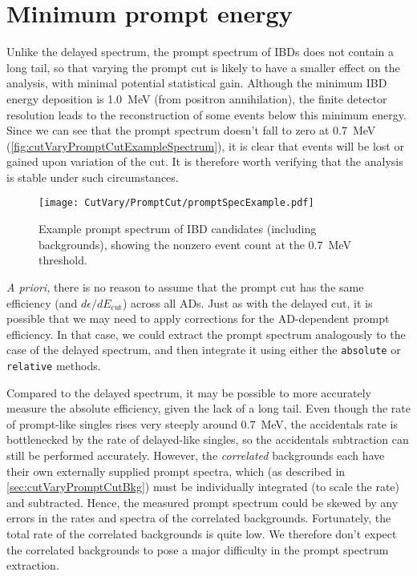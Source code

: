 \documentclass[../thesis.tex]{subfiles}
\begin{document}
\section{Minimum prompt energy}
\label{sec:cutVaryMinPrompt}

Unlike the delayed spectrum, the prompt spectrum of IBDs does not contain a long tail, so that varying the prompt cut is likely to have a smaller effect on the analysis, with minimal potential statistical gain. Although the minimum IBD energy deposition is 1.0~MeV (from positron annihilation), the finite detector resolution leads to the reconstruction of some events below this minimum energy. Since we can see that the prompt spectrum doesn't fall to zero at 0.7~MeV (\autoref{fig:cutVaryPromptCutExampleSpectrum}), it is clear that events will be lost or gained upon variation of the cut. It is therefore worth verifying that the analysis is stable under such circumstances.

\begin{figure}[h]
  \texttt{[image: CutVary/PromptCut/promptSpecExample.pdf]}
  \caption{Example prompt spectrum of IBD candidates (including backgrounds), showing the nonzero event count at the 0.7~MeV threshold.}
  \label{fig:cutVaryPromptCutExampleSpectrum}
\end{figure}

\emph{A priori,} there is no reason to assume that the prompt cut has the same efficiency (and $d\epsilon/dE_{\mathrm{cut}}$) across all ADs. Just as with the delayed cut, it is possible that we may need to apply corrections for the AD-dependent prompt efficiency. In that case, we could extract the prompt spectrum analogously to the case of the delayed spectrum, and then integrate it using either the \texttt{absolute} or \texttt{relative} methods.

Compared to the delayed spectrum, it may be possible to more accurately measure the absolute efficiency, given the lack of a long tail. Even though the rate of prompt-like singles rises very steeply around 0.7~MeV, the accidentals rate is bottlenecked by the rate of delayed-like singles, so the accidentals subtraction can still be performed accurately. However, the \emph{correlated} backgrounds each have their own externally supplied prompt spectra, which (as described in \autoref{sec:cutVaryPromptCutBkg}) must be individually integrated (to scale the rate) and subtracted. Hence, the measured prompt spectrum could be skewed by any errors in the rates and spectra of the correlated backgrounds. Fortunately, the total rate of the correlated backgrounds is quite low.
We therefore don't expect the correlated backgrounds to pose a major difficulty in the prompt spectrum extraction.
\end{document}
